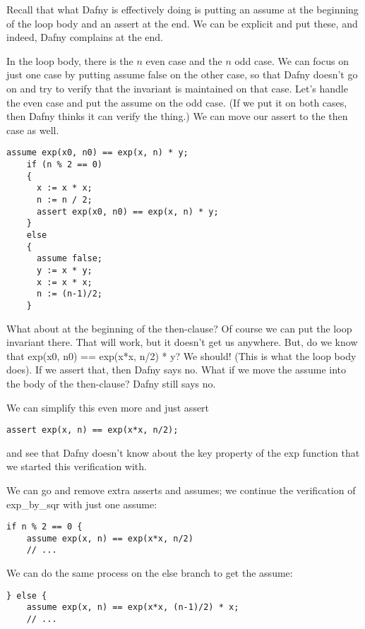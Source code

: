 \documentclass[11pt]{article}
\begin{document}
Recall that what Dafny is effectively doing is putting an \textsf{assume} at the beginning of the loop body
and an \textsf{assert} at the end. We can be explicit and put these, and indeed, Dafny complains at the end.

In the loop body, there is the $n$ even case and the $n$ odd case. We can focus on just one case
by putting \textsf{assume false} on the other case, so that Dafny doesn't go on and
try to verify that the invariant is maintained on that case. Let's handle the even case and put the assume
on the odd case. (If we put it on both cases, then Dafny thinks it can verify the thing.)
We can move our \textsf{assert} to the then case as well.

\begin{lstlisting}[language=dafny]
    assume exp(x0, n0) == exp(x, n) * y;
    if (n % 2 == 0)
    {
      x := x * x;
      n := n / 2;
      assert exp(x0, n0) == exp(x, n) * y;
    }
    else
    {
      assume false;
      y := x * y;
      x := x * x;
      n := (n-1)/2;
    }
\end{lstlisting}

What about at the beginning of the then-clause? Of course we can put the loop invariant there. That will work, but
it doesn't get us anywhere. But, do we know that \textsf{exp(x0, n0) == exp(x*x, n/2) * y}? We should! (This is
what the loop body does). If we assert that, then Dafny says no. What if we move the \textsf{assume} into the body
of the then-clause? Dafny still says no.

We can simplify this even more and just assert
\begin{lstlisting}[language=dafny]
  assert exp(x, n) == exp(x*x, n/2);
\end{lstlisting}
and see that Dafny doesn't know about the key property of the \textsf{exp} function that we started this verification with.

We can go and remove extra asserts and assumes; we continue the verification of \textsf{exp\_by\_sqr}
with just one \textsf{assume}:
\begin{lstlisting}[language=dafny]
  if n % 2 == 0 {
    assume exp(x, n) == exp(x*x, n/2)
    // ...
\end{lstlisting}

We can do the same process on the else branch to get the \textsf{assume}:
\begin{lstlisting}[language=dafny]
  } else {
    assume exp(x, n) == exp(x*x, (n-1)/2) * x;
    // ...
\end{lstlisting}
\end{document}
